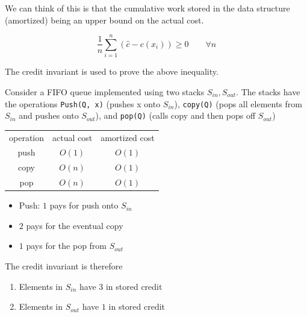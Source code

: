 \documentclass[../notes.tex]{subfiles}
\begin{document}
We can think of this is that the cumulative work stored in the data structure (amortized) being an upper bound on the actual cost.

\begin{equation}
	\frac{1}{n} \sum_{i=1}^{n}  (\hat{c} - c(x_i)) \ge  0 \qquad \forall n
\end{equation}



The credit invariant is used to prove the above inequality.



\begin{example}
	Consider a FIFO queue implemented using two stacks $ S_{in}, S_{out} $. The stacks have the operations \texttt{Push(Q, x)} (pushes x onto $ S_{in} $), \texttt{copy(Q)} (pops all elements from $ S_{in} $ and pushes onto $ S_{out} $), and \texttt{pop(Q)} (calls copy and then pops off $ S_{out} $)
\end{example}




\begin{table}[ht]
	\centering
	\begin{tabular}{|c|c|c|}
		operation & actual cost & amortized cost \\
		push & $ O(1)$ & $ O(1) $\\
		copy & $ O(n)$ & $ O(1) $\\
		pop & $ O(n) $&$ O(1) $ 
	\end{tabular}
\end{table}

\begin{itemize}
	\item Push: $ 1 $ pays for push onto $ S_{in} $
	\item $ 2 $ pays for the eventual copy
	\item $ 1 $ pays for the pop from $ S_{out} $
\end{itemize}

The credit invariant is therefore

\begin{enumerate}
	\item Elements in $ S_{in} $ have $ 3 $ in stored credit
	\item Elements in $ S_{out} $ have $ 1$ in stored credit
\end{enumerate}
\end{document}
